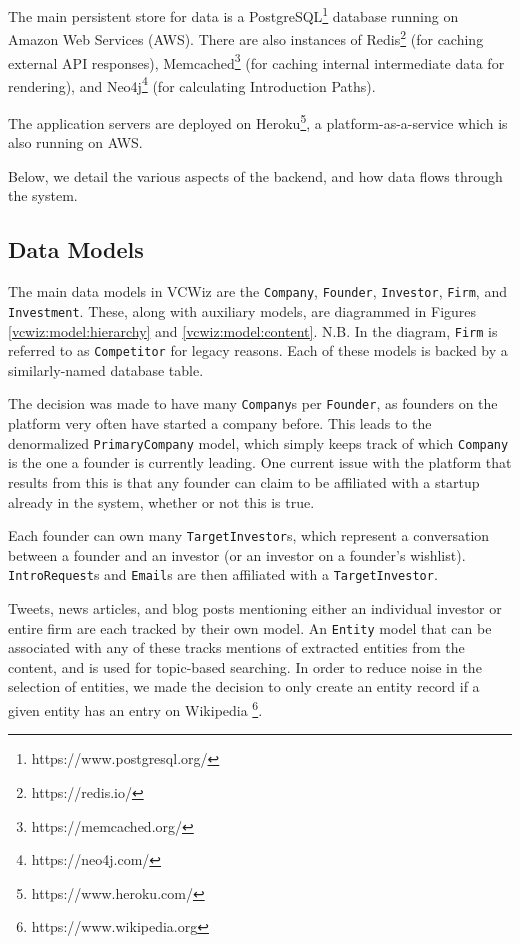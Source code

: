 
The main persistent store for data is a PostgreSQL\footnote{https://www.postgresql.org/} database running on Amazon Web Services (AWS). There are also instances of Redis\footnote{https://redis.io/} (for caching external API responses), Memcached\footnote{https://memcached.org/} (for caching internal intermediate data for rendering), and Neo4j\footnote{https://neo4j.com/} (for calculating Introduction Paths).

The application servers are deployed on Heroku\footnote{https://www.heroku.com/}, a platform-as-a-service which is also running on AWS.

Below, we detail the various aspects of the backend, and how data flows through the system.

\subsection{Data Models}

The main data models in VCWiz are the \texttt{Company}, \texttt{Founder}, \texttt{Investor}, \texttt{Firm}, and \texttt{Investment}. These, along with auxiliary models, are diagrammed in Figures \ref{vcwiz:model:hierarchy} and \ref{vcwiz:model:content}. N.B. In the diagram, \texttt{Firm} is referred to as \texttt{Competitor} for legacy reasons. Each of these models is backed by a similarly-named database table.

The decision was made to have many \texttt{Company}s per \texttt{Founder}, as founders on the platform very often have started a company before. This leads to the denormalized \texttt{PrimaryCompany} model, which simply keeps track of which \texttt{Company} is the one a founder is currently leading. One current issue with the platform that results from this is that any founder can claim to be affiliated with a startup already in the system, whether or not this is true.

Each founder can own many \texttt{TargetInvestor}s, which represent a conversation between a founder and an investor (or an investor on a founder's wishlist). \texttt{IntroRequest}s and \texttt{Email}s are then affiliated with a \texttt{TargetInvestor}.

Tweets, news articles, and blog posts mentioning either an individual investor or entire firm are each tracked by their own model. An \texttt{Entity} model that can be associated with any of these tracks mentions of extracted entities from the content, and is used for topic-based searching. In order to reduce noise in the selection of entities, we made the decision to only create an entity record if a given entity has an entry on Wikipedia \footnote{https://www.wikipedia.org}.

